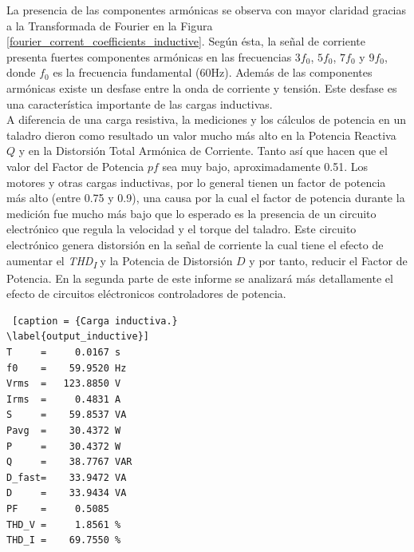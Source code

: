 \documentclass[journal]{IEEEtran}
\begin{document}
La presencia de las componentes armónicas se observa 
con mayor claridad gracias a la Transformada de Fourier
en la Figura 
\ref{fourier_corrent_coefficients_inductive}.
Según ésta, la señal de corriente 
presenta fuertes componentes armónicas en las frecuencias
$3 f_0$, $5 f_0$, $7 f_0$  y $9 f_0$, donde $f_0$ es la 
frecuencia fundamental (60Hz). Además de las componentes 
armónicas existe un desfase entre la onda de corriente 
y tensión. Este desfase es una característica importante 
de las cargas inductivas. \\


A diferencia de una carga resistiva, la mediciones y 
los cálculos de potencia en un taladro dieron como 
resultado un valor mucho más alto en la  
Potencia Reactiva $Q$ y en la Distorsión Total Armónica 
de Corriente. Tanto así que hacen 
que el valor del Factor de Potencia $pf$ sea muy bajo, 
aproximadamente 0.51. Los motores y otras cargas 
inductivas, por lo general tienen un factor de potencia 
más alto (entre 0.75 y 0.9), una causa por la cual el 
factor de potencia durante la medición fue mucho más 
bajo que lo esperado es la presencia de un circuito 
electrónico que regula la velocidad y el torque del 
taladro. Este circuito electrónico genera distorsión en la 
señal de corriente la cual tiene el efecto de  
aumentar el \textit{THD\textsubscript{I}} y la Potencia 
de Distorsión $D$ y por tanto, reducir el Factor de 
Potencia. En la segunda parte de este informe se analizará
más detallamente el efecto de circuitos eléctronicos 
controladores de potencia. 

\begin{lstlisting} [caption = {Carga inductiva.}
\label{output_inductive}]
T     =     0.0167 s 
f0    =    59.9520 Hz 
Vrms  =   123.8850 V
Irms  =     0.4831 A
S     =    59.8537 VA
Pavg  =    30.4372 W 
P     =    30.4372 W 
Q     =    38.7767 VAR 
D_fast=    33.9472 VA 
D     =    33.9434 VA 
PF    =     0.5085 
THD_V =     1.8561 %
THD_I =    69.7550 %
\end{lstlisting}
\end{document}
